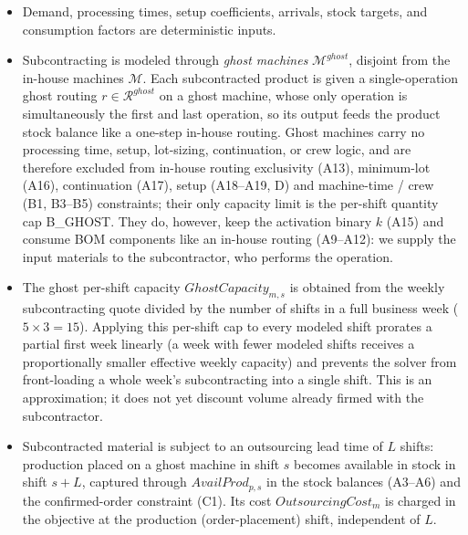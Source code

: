 \documentclass{article}
\begin{document}
\begin{itemize}
\item Demand, processing times, setup coefficients, arrivals, stock targets, and consumption factors are deterministic inputs.

\item Subcontracting is modeled through \emph{ghost machines} $\mathcal{M}^{ghost}$, disjoint from the in-house machines $\mathcal{M}$. Each subcontracted product is given a single-operation ghost routing $r \in \mathcal{R}^{ghost}$ on a ghost machine, whose only operation is simultaneously the first and last operation, so its output feeds the product stock balance like a one-step in-house routing. Ghost machines carry no processing time, setup, lot-sizing, continuation, or crew logic, and are therefore excluded from in-house routing exclusivity (A13), minimum-lot (A16), continuation (A17), setup (A18--A19, D) and machine-time / crew (B1, B3--B5) constraints; their only capacity limit is the per-shift quantity cap B\_GHOST. They do, however, keep the activation binary $k$ (A15) and consume BOM components like an in-house routing (A9--A12): we supply the input materials to the subcontractor, who performs the operation.

\item The ghost per-shift capacity $GhostCapacity_{m,s}$ is obtained from the weekly subcontracting quote divided by the number of shifts in a full business week ($5 \times 3 = 15$). Applying this per-shift cap to every modeled shift prorates a partial first week linearly (a week with fewer modeled shifts receives a proportionally smaller effective weekly capacity) and prevents the solver from front-loading a whole week's subcontracting into a single shift. This is an approximation; it does not yet discount volume already firmed with the subcontractor.

\item Subcontracted material is subject to an outsourcing lead time of $L$ shifts: production placed on a ghost machine in shift $s$ becomes available in stock in shift $s+L$, captured through $AvailProd_{p,s}$ in the stock balances (A3--A6) and the confirmed-order constraint (C1). Its cost $OutsourcingCost_m$ is charged in the objective at the production (order-placement) shift, independent of $L$.

\end{itemize}

\pagebreak
\noindent\text{---------------------------------------------------------------------------------------------------------}
\end{document}
